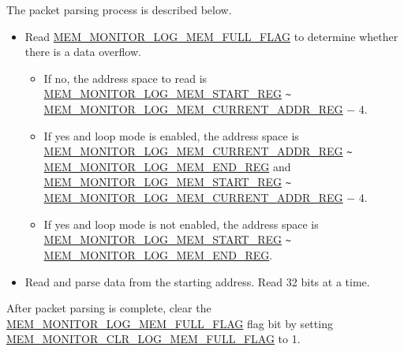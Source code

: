 \documentclass[main\_\_EN.tex]{subfiles}
\begin{document}
The packet parsing process is described below.

\begin{itemize}
    \item Read \hyperref[fielddesc:MEMMONITORLOGMEMFULLFLAG]{MEM\_MONITOR\_LOG\_MEM\_FULL\_FLAG} to determine whether there is a data overflow.
    \begin{itemize}
        \item If no, the address space to read is \hyperref[regdesc:MEMMONITORLOGMEMSTARTREG]{MEM\_MONITOR\_LOG\_MEM\_START\_REG}  \verb+~+ \hyperref[regdesc:MEMMONITORLOGMEMCURRENTADDRREG]{MEM\_MONITOR\_LOG\_MEM\_CURRENT\_ADDR\_REG} $-$ 4.
        \item If yes and loop mode is enabled, the address space is \hyperref[regdesc:MEMMONITORLOGMEMCURRENTADDRREG]{MEM\_MONITOR\_LOG\_MEM\_CURRENT\_ADDR\_REG} \verb+~+ \hyperref[regdesc:MEMMONITORLOGMEMENDREG]{MEM\_MONITOR\_LOG\_MEM\_END\_REG} and \hyperref[regdesc:MEMMONITORLOGMEMSTARTREG]{MEM\_MONITOR\_LOG\_MEM\_START\_REG} \verb+~+ \hyperref[regdesc:MEMMONITORLOGMEMCURRENTADDRREG]{MEM\_MONITOR\_LOG\_MEM\_CURRENT\_ADDR\_REG} $-$ 4.
        \item If yes and loop mode is not enabled, the address space is \hyperref[regdesc:MEMMONITORLOGMEMSTARTREG]{MEM\_MONITOR\_LOG\_MEM\_START\_REG} \verb+~+ \hyperref[regdesc:MEMMONITORLOGMEMENDREG]{MEM\_MONITOR\_LOG\_MEM\_END\_REG}.
    \end{itemize}
    \item Read and parse data from the starting address. Read 32 bits at a time.
\end{itemize}

After packet parsing is complete, clear the \hyperref[fielddesc:MEMMONITORLOGMEMFULLFLAG]{MEM\_MONITOR\_LOG\_MEM\_FULL\_FLAG} flag bit by setting \hyperref[fielddesc:MEMMONITORCLRLOGMEMFULLFLAG]{MEM\_MONITOR\_CLR\_LOG\_MEM\_FULL\_FLAG} to 1.


\end{document}
